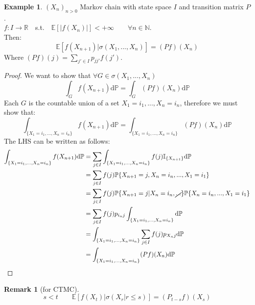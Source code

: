 \documentclass[10pt,a4paper]{article}
\theoremstyle{definition}
\newtheorem{exi}{Example}[section]
\newtheorem*{rem}{Remark}
\begin{document}
\begin{exi}
	$(X_n)_{n>0}$ Markov chain with state space $I$ and transition matrix $P$.\\
	$f:I\to\mathbb{R} \quad$s.t.$\quad\mathbb{E}[|f(X_n)|]<+\infty \qquad \forall n\in\mathbb{N}$.\\ Then:
	\begin{equation*}
		\mathbb{E}[f(X_{n+1})|\sigma(X_1,...,X_n)]=(Pf)(X_n)
	\end{equation*}
Where $(Pf)(j)=\sum_{j'\in I}p_{jj'}f(j')$.
\begin{proof}
	We want to show that $\forall G \in \sigma(X_1,...,X_n)$
	\begin{equation*}
		\int_{G}f(X_{n+1})\mathrm{d}\mathbb{P}=\int_{G}(Pf)(X_n)\mathrm{d}\mathbb{P}
	\end{equation*}
Each $G$ is the countable union of a set ${X_1=i_1,...,X_n=i_n}$, therefore we must show that:
\begin{equation*}
	\int_{\{X_1=i_1,...,X_n=i_n\}}f(X_{n+1})\mathrm{d}\mathbb{P}=\int_{\{X_1=i_1,...,X_n=i_n\}}(Pf)(X_n)\mathrm{d}\mathbb{P}
\end{equation*}
The LHS can be written as follows:
\begin{equation*}
	\begin{split}
		\int_{\{X_1=i_1,...,X_n=i_n\}}f(X_{n+1})\mathrm{d}\mathbb{P}&=\sum_{j\in I}\int_{\{X_1=i_1,...,X_n=i_n\}}f(j)\mathbb{I}_{\{X_{n+1}\}}\mathrm{d}\mathbb{P} \\
		&=\sum_{j\in I}f(j)\mathbb{P}\{X_{n+1}=j,X_n=i_n,...,X_1=i_1\}\\
		&=\sum_{j\in I}f(j)\mathbb{P}\{X_{n+1}=j|X_n=i_n,\cancel{...}\}\mathbb{P}\{X_n=i_n,...,X_1=i_1\} \\
		&=\sum_{j\in I}f(j)p_{i_n j}\int_{\{X_1=i_1,...,X_n=i_n\}}\mathrm{d}\mathbb{P} \\
		&=\int_{\{X_1=i_1,...,X_n=i_n\}}\sum_{j\in I}f(j)p_{X_n j}\mathrm{d}\mathbb{P} \\
		&=\int_{\{X_1=i_1,...,X_n=i_n\}}(Pf)(X_n)\mathrm{d}\mathbb{P}
	\end{split}
\end{equation*}
\end{proof}
\end{exi}
\begin{rem}[for CTMC]
	\begin{equation*}
		s<t \qquad \mathbb{E}[f(X_t)|\sigma(X_r|r\leq s)]=(P_{t-s}f)(X_s)
	\end{equation*}
\end{rem}
\end{document}
